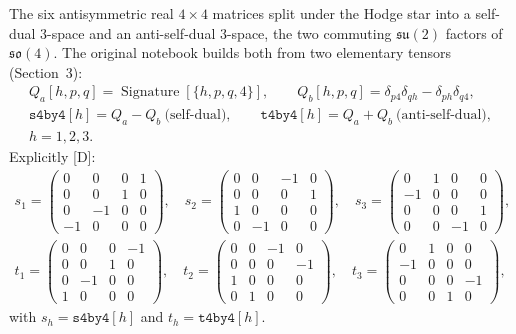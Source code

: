 The six antisymmetric real $4\times4$ matrices split under the Hodge star into a self-dual
3-space and an anti-self-dual 3-space, the two commuting $\mathfrak{su}(2)$ factors of
$\mathfrak{so}(4)$. The original notebook builds both from two elementary tensors (Section~3):
\begin{gather}
  Q_a[h,p,q] = \operatorname{Signature}[\{h,p,q,4\}],\qquad
  Q_b[h,p,q] = \delta_{p4}\delta_{qh} - \delta_{ph}\delta_{q4},\\
  \texttt{s4by4}[h] = Q_a - Q_b \ \text{(self-dual)},\qquad
  \texttt{t4by4}[h] = Q_a + Q_b \ \text{(anti-self-dual)},\\
  h=1,2,3.
\end{gather}
Explicitly [D]:
\begin{gather*}
s_1=\left(\begin{smallmatrix}0&0&0&1\\0&0&1&0\\0&-1&0&0\\-1&0&0&0\end{smallmatrix}\right),\quad
s_2=\left(\begin{smallmatrix}0&0&-1&0\\0&0&0&1\\1&0&0&0\\0&-1&0&0\end{smallmatrix}\right),\quad
s_3=\left(\begin{smallmatrix}0&1&0&0\\-1&0&0&0\\0&0&0&1\\0&0&-1&0\end{smallmatrix}\right),\\
t_1=\left(\begin{smallmatrix}0&0&0&-1\\0&0&1&0\\0&-1&0&0\\1&0&0&0\end{smallmatrix}\right),\quad
t_2=\left(\begin{smallmatrix}0&0&-1&0\\0&0&0&-1\\1&0&0&0\\0&1&0&0\end{smallmatrix}\right),\quad
t_3=\left(\begin{smallmatrix}0&1&0&0\\-1&0&0&0\\0&0&0&-1\\0&0&1&0\end{smallmatrix}\right),
\end{gather*}
with $s_h = \texttt{s4by4}[h]$ and $t_h = \texttt{t4by4}[h]$.

